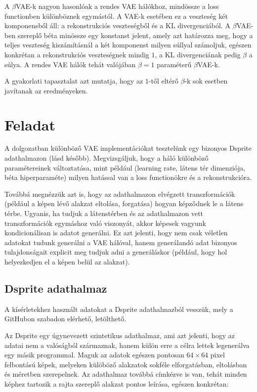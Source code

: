 \documentclass[12pt]{article}
\begin{document}
A $\beta$VAE-k nagyon hasonlóak a rendes VAE hálókhoz, mindössze a loss functionben különböznek egymástól. A VAE-k esetében ez a veszteség két komponensből áll: a rekonstrukciós veszteségből és a KL divergenciából. A $\beta$VAE-ben szereplő béta minössze egy konstanst jelent, amely azt határozza meg, hogy a teljes veszteség kiszámításnál a két komponenst milyen súllyal számoljuk, egészen konkrétan a rekonstrukciós veszteségnek mindig $1$, a KL divergenciának pedig $\beta$ a súlya. A rendes VAE hálók tehát valójában $\beta=1$ paraméterű $\beta$VAE-k.

A gyakorlati tapasztalat azt mutatja, hogy az $1$-től eltérő $\beta$-k sok esetben javítanak az eredményeken.

\section{Feladat}

A dolgozatban különböző VAE implementációkat tesztelünk egy bizonyos Dsprite adathalmazon (lásd később). Megvizsgáljuk, hogy a háló különböző paramétereinek változtatása, mint például (learning rate, látens tér dimenziója, béta hiperparaméte) milyen hatással van a loss functionökre és a rekonstrukcióra.

Továbbá megnézzük azt is, hogy az adathalmazon elvégzett transzformációk (például a képen lévő alakzat eltolása, forgatása) hogyan képződnek le a látens térbe. Ugyanis, ha tudjuk a látenstérben és az adathalmazon vett transzformációk egymáshoz való viszonyát, akkor képesek vagyunk kondicionálisan is adatot generálni. Ez azt jelenti, hogy nem csak véletlen adatokat tudunk generálni a VAE hálóval, hanem generálandó adat bizonyos tulajdonságait explicit meg tudjuk adni a generáláskor (például, hogy hol helyezkedjen el a képen belül az alakzat).

\subsection{Dsprite adathalmaz}

A kísérletekhez használt adatokat a Dsprite adathalmazból vesszük, mely a GitHubon szabadon elérhető, letölthető.

Az Dsprite egy úgynevezett szintetikus adathalmaz, ami azt jelenti, hogy az adatai nem a valóságból származnak, hanem külön erre a célra lettek legenerálva egy másik programmal. Maguk az adatok egészen pontosan $64\times64$ pixel felbontású képek, melyeken külöböző alakzatok sokféle elforgatásban, eltolásban és méretben szerepelnek. Az adathalmaz továbbá címkézve is van, tehát minden képhez tartozik a rajta szereplő alakzat pontos leírása, egészen konkrétan:
\end{document}
